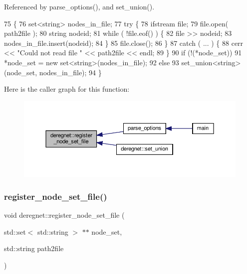 Referenced by parse\+\_\+options(), and set\+\_\+union().


\begin{DoxyCode}
75                                               \{
76     set<string> nodes\_in\_file;
77     \textcolor{keywordflow}{try} \{
78         ifstream file;
79         file.open( path2file );
80         \textcolor{keywordtype}{string} nodeid;
81         \textcolor{keywordflow}{while} ( !file.eof() ) \{
82             file >> nodeid;
83             nodes\_in\_file.insert(nodeid);
84         \}
85         file.close();
86     \}
87     \textcolor{keywordflow}{catch} ( ... ) \{
88         cerr << \textcolor{stringliteral}{"Could not read file "} << path2file << endl;
89     \}
90     \textcolor{keywordflow}{if} (!(*node\_set))
91         *node\_set = \textcolor{keyword}{new} set<string>(nodes\_in\_file);
92     \textcolor{keywordflow}{else}
93         set\_union<string>(node\_set, nodes\_in\_file);
94 \}
\end{DoxyCode}
Here is the caller graph for this function\+:\nopagebreak
\begin{figure}[H]
\begin{center}
\leavevmode
\includegraphics[width=350pt]{namespacederegnet_a11d599a7ac217876cf35b3f6899532c0_icgraph}
\end{center}
\end{figure}
\mbox{\label{namespacederegnet_afbda9b78d4072e2058fdd242c4783cf1}} 
\subsubsection{\texorpdfstring{register\+\_\+node\+\_\+set\+\_\+file()}{register\_node\_set\_file()}\hspace{0.1cm}{\footnotesize\ttfamily [2/2]}}
{\footnotesize\ttfamily void deregnet\+::register\+\_\+node\+\_\+set\+\_\+file (\begin{DoxyParamCaption}\item[{std\+::set$<$ std\+::string $>$ $\ast$$\ast$}]{node\+\_\+set,  }\item[{std\+::string}]{path2file }\end{DoxyParamCaption})}



